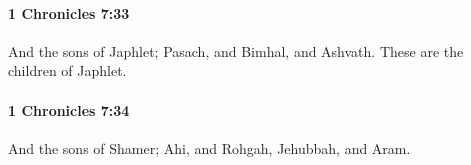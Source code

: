 		\paragraph{1 Chronicles 7:33} %
			\label{1CHRONICLES-7-33}

			And the sons of Japhlet; Pasach, and Bimhal, and Ashvath. These are the children of Japhlet.


		\paragraph{1 Chronicles 7:34} %
			\label{1CHRONICLES-7-34}

			And the sons of Shamer; Ahi, and Rohgah, Jehubbah, and Aram.


